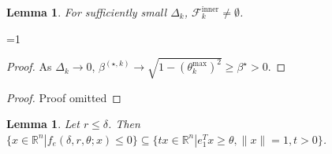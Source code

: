 \documentclass{article}
\newtheorem{lemma}[theorem]{Lemma}
\theoremstyle{case}
\newcommand{\xk}{{x^{(k)}}}
\newcommand{\dk}{\Delta_k}
\newcommand{\huk}{{{\hat u}^{(k)}}}
\newcommand{\bsk}{{\beta^{(\star, k)}}}
\newcommand{\bs}{{\beta^{\star}}}
\newcommand{\fcki}{{\mathcal {F}^{\text{inner}}_k}}
\newcommand{\rn}{{\mathbb R^{n}}}
\def\includeproofs{1}
\begin{document}
\begin{lemma}
For sufficiently small $\dk$, $\fcki \ne \emptyset$.
\end{lemma}
\ifnum\includeproofs=1
\begin{proof}
As $\dk \to 0$, $\bsk \to \sqrt{1 - (\theta^{\text{max}}_k) ^2} \ge \bs > 0$.
\end{proof}
\else
\begin{proof}
Proof omitted
\end{proof}
\fi



\begin{lemma}
\label{ellipse_in_cone}
Let $r \le \delta$.
Then $\{x \in \rn | f_e(\delta, r, \theta; x) \le 0\} \subseteq \{tx\in\rn| e_1^T x \ge \theta,\|x\|=1, t>0\}$.
\end{lemma}
\end{document}
